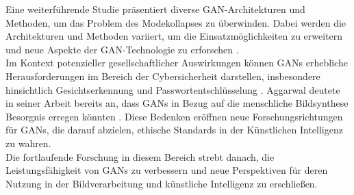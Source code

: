 Eine weiterführende Studie \cite{Hong.2020} präsentiert diverse GAN-Architekturen und Methoden, um das Problem des Modekollapses zu überwinden. Dabei werden die Architekturen und Methoden variiert, um die Einsatzmöglichkeiten zu erweitern \cite{Jain.2020, Eckerli.2021, Sharma.2022} und neue Aspekte der GAN-Technologie zu erforschen \cite{Srivastava.2017}.
\\\newline
Im Kontext potenzieller gesellschaftlicher Auswirkungen können GANs erhebliche Herausforderungen im Bereich der Cybersicherheit darstellen, insbesondere hinsichtlich Gesichtserkennung und Passwortentschlüsselung \cite{Hitaj.912017}. Aggarwal deutete in seiner Arbeit bereits an, dass GANs in Bezug auf die menschliche Bildsynthese Besorgnis erregen könnten \cite{Aggarwal.2021}. Diese Bedenken eröffnen neue Forschungsrichtungen für GANs, die darauf abzielen, ethische Standards in der Künstlichen Intelligenz zu wahren.
\\
Die fortlaufende Forschung in diesem Bereich strebt danach, die Leistungsfähigkeit von GANs zu verbessern und neue Perspektiven für deren Nutzung in der Bildverarbeitung und künstliche Intelligenz zu erschließen.